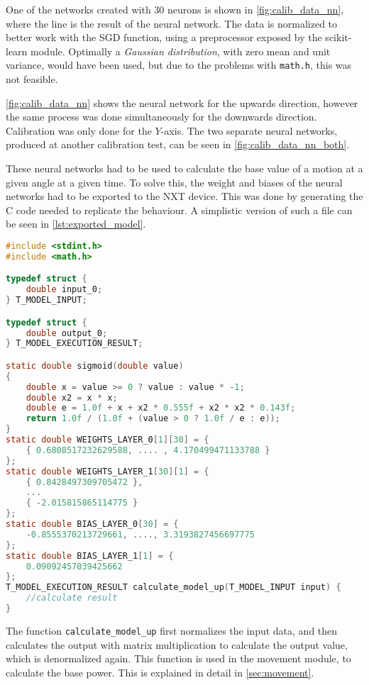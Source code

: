 One of the networks created with 30 neurons is shown in \autoref{fig:calib_data_nn}, where the line is the result of the neural network.
The data is normalized to better work with the SGD function, using a preprocessor exposed by the scikit-learn module.
Optimally a \textit{Gaussian distribution}, with zero mean and unit variance, would have been used, but due to the problems with \texttt{math.h}, this was not feasible.


\autoref{fig:calib_data_nn} shows the neural network for the upwards direction, however the same process was done simultaneously for the downwards direction.
Calibration was only done for the $Y$-axis.
The two separate neural networks, produced at another calibration test, can be seen in \autoref{fig:calib_data_nn_both}.



These neural networks had to be used to calculate the base value of a motion at a given angle at a given time.
To solve this, the weight and biases of the neural networks had to be exported to the NXT device.
This was done by generating the C code needed to replicate the behaviour.
A simplistic version of such a file can be seen in \autoref{lst:exported_model}.


\begin{lstlisting}[language=C,label={lst:exported_model},firstnumber={1},caption={Autogenerated model for getting power to move up}]
#include <stdint.h>
#include <math.h>

typedef struct {
	double input_0;
} T_MODEL_INPUT;

typedef struct {
	double output_0;
} T_MODEL_EXECUTION_RESULT;

static double sigmoid(double value)
{
	double x = value >= 0 ? value : value * -1;
	double x2 = x * x;
	double e = 1.0f + x + x2 * 0.555f + x2 * x2 * 0.143f;
	return 1.0f / (1.0f + (value > 0 ? 1.0f / e : e));
}
static double WEIGHTS_LAYER_0[1][30] = {
	{ 0.6808517232629588, .... , 4.170499471133788 }
};
static double WEIGHTS_LAYER_1[30][1] = {
	{ 0.8428497309705472 },
	...
	{ -2.015815865114775 }
};
static double BIAS_LAYER_0[30] = {
	-0.8555370213729661, ...., 3.3193827456697775
};
static double BIAS_LAYER_1[1] = {
	0.09092457039425662
};
T_MODEL_EXECUTION_RESULT calculate_model_up(T_MODEL_INPUT input) {
	//calculate result
}

\end{lstlisting}
The function \texttt{calculate\_model\_up} first normalizes the input data, and then calculates the output with matrix multiplication to calculate the output value, which is denormalized again.
This function is used in the movement module, to calculate the base power.
This is explained in detail in \autoref{sec:movement}.


